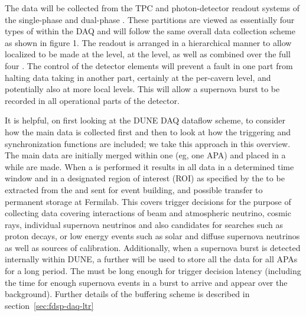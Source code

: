 
The data will be collected from the TPC and photon-detector readout
systems of the single-phase and dual-phase . 
These partitions are viewed as essentially four types of
 within the DAQ and will follow the same overall
data collection scheme as shown in figure 1. 
The readout is arranged in a hierarchical manner to allow localized
 to be made at the  level, at the
 level, as well as combined over the full four . 
The control of the detector elements will prevent a fault in one part from halting data taking in another part, certainly at the per-cavern
level, and potentially also at more local levels. 
This will allow a supernova burst to be recorded in all operational parts of the detector.

It is helpful, on first looking at the DUNE DAQ dataflow scheme, to
consider how the main data is collected first and then to look at how
the triggering and synchronization functions are included; we take
this approach in this overview. 
The main data are initially merged within one  (eg, one
APA) and placed in a  while 
are made. 
When a  is performed it results in all data in a
determined time window and in a designated region of interest (ROI) as
specified by the  to be extracted from the
 and sent for event building,  and
possible transfer to permanent storage at Fermilab. 
This covers trigger decisions for the purpose of collecting data
covering interactions of beam and atmospheric neutrino, cosmic rays,
individual supernova neutrinos and also candidates for searches such
as proton decays, or low energy events such as solar and diffuse
supernova neutrinos as well as sources of calibration. 
Additionally, when a supernova burst is detected internally within
DUNE, a further  will be used to store all the data
for all APAs for a long period. 
The  must be long enough for trigger decision
latency (including the time for enough supernova events in a burst to
arrive and appear over the background). Further details of the
buffering scheme is described in section~\ref{sec:fdsp-daq-ltr}


